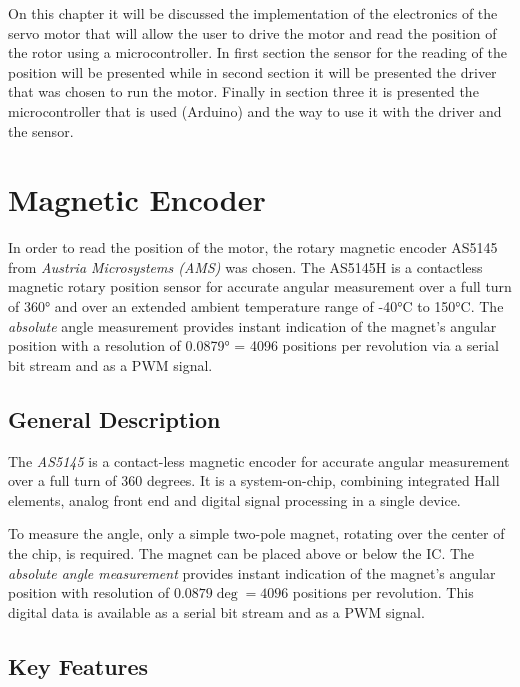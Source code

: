 \newpage

On this chapter it will be discussed the implementation of the electronics of the servo motor that will allow the user to drive the motor and read the position of the rotor using a microcontroller. In first section the sensor for the reading of the position will be presented while in second section it will be presented the driver that was chosen to run the motor. Finally in section three it is presented the microcontroller that is used (Arduino) and the way to use it with the driver and the sensor.

\section{Magnetic Encoder} \label{sec:Magnetic Encoder}

In order to read the position of the motor, the rotary magnetic encoder AS5145 from \textit{Austria Microsystems (AMS)} \cite{AS5145} was chosen. The AS5145H is a contactless magnetic rotary position sensor for accurate angular measurement over a full turn of 360° and over an extended ambient temperature range of -40°C to 150°C. The \textit{absolute} angle measurement provides instant indication of the magnet’s angular position with a resolution of 0.0879° = 4096 positions per revolution via a serial bit stream and as a PWM signal.

\subsection{General Description}

The \textit{AS5145} is a contact-less magnetic encoder for accurate angular measurement over a full turn of 360 degrees. It is a system-on-chip, combining integrated Hall elements, analog front end and digital signal processing in a single device.

To measure the angle, only a simple two-pole magnet, rotating over the center of the chip, is required. The magnet can be placed above or below the IC. The \textit{absolute angle measurement} provides instant indication of the magnet's angular position with resolution of $0.0879\deg = 4096$ positions per revolution. This digital data is available as a serial bit stream and as a PWM signal.

\subsection{Key Features}

